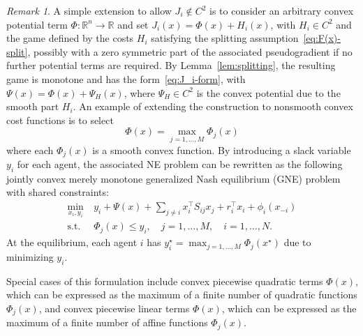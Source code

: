 \documentclass[11pt, a4paper]{article}
\newcommand{\rr}{\mathbb{R}}
\theoremstyle{remark}
\newtheorem{remark}[theorem]{Remark}
\theoremstyle{plain}
\begin{document}
\begin{remark}
\label{rmk:nonsmooth-Psi}
A simple extension to allow $J_i\not\in C^2$ is to consider an arbitrary convex potential 
term $\Phi:\rr^n\to\rr$ and set $J_i(x)=\Phi(x)+H_i(x)$, with $H_i\in C^2$ and the game defined by the costs $H_i$ satisfying the splitting assumption~\eqref{eq:F(x)-split}, possibly with a zero symmetric part of the associated pseudogradient if no further potential terms are required. By Lemma~\ref{lem:splitting}, the resulting game is monotone and has the form~\eqref{eq:J_i-form}, with $\Psi(x)=\Phi(x)+\Psi_H(x)$, where $\Psi_H\in C^2$ is the convex potential due to the smooth part $H_i$. An example of extending the construction to nonsmooth convex cost functions is to select 
\[
    \Phi(x) = \max_{j=1,\ldots,M} \Phi_j(x)
\]
where each $\Phi_j(x)$ is a smooth convex function. By introducing a slack variable $y_i$ for each agent, the associated NE problem can be rewritten as the following jointly convex merely monotone generalized Nash equilibrium (GNE) problem with shared constraints:
\[
    \begin{aligned}
    \min_{x_i,y_i}\ & y_i+ \Psi(x)+\sum_{j\neq i}x_i^\top S_{ij}x_j+r_i^\top x_i
+\phi_i(x_{-i})
    \\
    \text{s.t. } &\Phi_j(x)\leq y_i,\quad j=1,\ldots,M,\quad i=1,\ldots,N.
    \end{aligned}
\]
At the equilibrium, each agent $i$ has $y_i^\star = \max_{j=1,\ldots,M} \Phi_j(x^\star)$ due to minimizing $y_i$.

Special cases of this formulation include convex piecewise quadratic terms $\Phi(x)$, which can be expressed as the maximum of a finite number of quadratic functions $\Phi_j(x)$, and convex piecewise linear terms $\Phi(x)$, which can be expressed as the maximum of a finite number of affine functions $\Phi_j(x)$. 
\end{remark}
\end{document}
